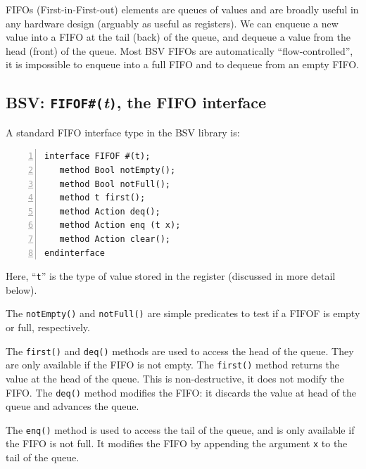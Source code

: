 
FIFOs (First-in-First-out) elements are queues of values and are
broadly useful in any hardware design (arguably as useful as
registers).  We can enqueue a new value into a FIFO at the tail (back)
of the queue, and dequeue a value from the head (front) of the queue.
Most BSV FIFOs are automatically ``flow-controlled'', {\ie} it is
impossible to enqueue into a full FIFO and to dequeue from an empty
FIFO.


\subsection{BSV: {\tt FIFOF\#(}\emph{t}{\tt )}, the FIFO interface}

\label{Sec_CPU_Module_Skeleton_FIFOF_interface}


A standard FIFO interface type in the BSV library is:

\begin{Verbatim}[frame=single, numbers=left]
interface FIFOF #(t);
   method Bool notEmpty();
   method Bool notFull();
   method t first();
   method Action deq();
   method Action enq (t x);
   method Action clear();
endinterface
\end{Verbatim}

Here, ``\verb|t|'' is the type of value stored in the register
(discussed in more detail below).

The \verb|notEmpty()| and \verb|notFull()| are simple predicates to
test if a FIFOF is empty or full, respectively.

The \verb|first()| and \verb|deq()| methods are used to access the
head of the queue.  They are only available if the FIFO is not empty.
The \verb|first()| method returns the value at the head of the queue.
This is non-destructive, {\ie} it does not modify the FIFO.  The
\verb|deq()| method modifies the FIFO: it discards the value at head
of the queue and advances the queue.

The \verb|enq()| method is used to access the tail of the queue, and
is only available if the FIFO is not full.  It modifies the FIFO by
appending the argument \verb|x| to the tail of the queue.

